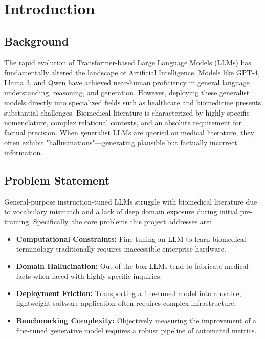 \documentclass[12pt,a4paper]{report}
\begin{document}
\tableofcontents
\listoffigures
\listoftables

\newpage
{}

\chapter{Introduction}

\section{Background}
The rapid evolution of Transformer-based Large Language Models (LLMs) has fundamentally altered the landscape of Artificial Intelligence. Models like GPT-4, Llama 3, and Qwen have achieved near-human proficiency in general language understanding, reasoning, and generation. However, deploying these generalist models directly into specialized fields such as healthcare and biomedicine presents substantial challenges. Biomedical literature is characterized by highly specific nomenclature, complex relational contexts, and an absolute requirement for factual precision. When generalist LLMs are queried on medical literature, they often exhibit "hallucinations"—generating plausible but factually incorrect information.

\section{Problem Statement}
General-purpose instruction-tuned LLMs struggle with biomedical literature due to vocabulary mismatch and a lack of deep domain exposure during initial pre-training. Specifically, the core problems this project addresses are:
\begin{itemize}
    \item \textbf{Computational Constraints:} Fine-tuning an LLM to learn biomedical terminology traditionally requires inaccessible enterprise hardware.
    \item \textbf{Domain Hallucination:} Out-of-the-box LLMs tend to fabricate medical facts when faced with highly specific inquiries.
    \item \textbf{Deployment Friction:} Transporting a fine-tuned model into a usable, lightweight software application often requires complex infrastructure.
    \item \textbf{Benchmarking Complexity:} Objectively measuring the improvement of a fine-tuned generative model requires a robust pipeline of automated metrics.
\end{itemize}
\end{document}
